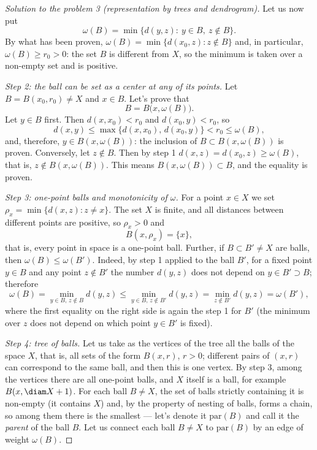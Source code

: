 \documentclass[a4paper,12pt]{report}
\begin{document}
\begin{proof}[Solution to the problem \textup{3} \textup{(}representation by trees and dendrogram\textup{)}]
Let us now put
\[
\omega(B)=\min\bigl\{d(y,z):\ y\in B,\ z\notin B\bigr\} .
\]
By what has been proven, $\omega(B)=\min\{d(x_0,z):z\notin B\}$ and, in particular, $\omega(B)\ge r_0>0$\textup{:} the set $B$ is different from $X$, so the minimum is taken over a non-empty set and is positive.

\textit{Step \textup{2}\textup{:} the ball can be set as a center at any of its points.} Let $B=B(x_0,r_0)\ne X$ and $x\in B$. Let's prove that
\[
B=B\bigl(x,\omega(B)\bigr).
\]
Let $y\in B$ first. Then $d(x,x_0)<r_0$ and $d(x_0,y)<r_0$, so
\[
d(x,y)\le\max\bigl\{d(x,x_0),\,d(x_0,y)\bigr\}<r_0\le\omega(B),
\]
and, therefore, $y\in B(x,\omega(B))$\textup{:} the inclusion of $B\subset B(x,\omega(B))$ is proven. Conversely, let $z\notin B$. Then by step \textup{1} $d(x,z)=d(x_0,z)\ge\omega(B)$, that is, $z\notin B(x,\omega(B))$. This means $B(x,\omega(B))\subset B$, and the equality is proven.

\textit{Step \textup{3}\textup{:} one-point balls and monotonicity of $\omega$.} For a point $x\in X$ we set $\rho_x=\min\{d(x,z):z\ne x\}$. The set $X$ is finite, and all distances between different points are positive, so $\rho_x>0$ and
\[
B(x,\rho_x)=\{x\},
\]
that is, every point in space is a one-point ball. Further, if $B\subset B'\ne X$ are balls, then $\omega(B)\le\omega(B')$. Indeed, by step \textup{1} applied to the ball $B'$, for a fixed point $y\in B$ and any point $z\notin B'$ the number $d(y,z)$ does not depend on $y\in B'\supset B$\textup{;} therefore
\[
\omega(B)=\min_{y\in B,\,z\notin B}d(y,z)\le\min_{y\in B,\,z\notin B'}d(y,z)=\min_{z\notin B'}d(y,z)=\omega(B'),
\]
where the first equality on the right side is again the step \textup{1} for $B'$ \textup{(}the minimum over $z$ does not depend on which point $y\in B'$ is fixed\textup{)}.

\textit{Step \textup{4}\textup{:} tree of balls.} Let us take as the vertices of the tree all the balls of the space $X$, that is, all sets of the form $B(x,r)$, $r>0$\textup{;} different pairs of $(x,r)$ can correspond to the same ball, and then this is one vertex. By step \textup{3}, among the vertices there are all one-point balls, and $X$ itself is a ball, for example $B(x,\diam X+1)$. For each ball $B\ne X$, the set of balls strictly containing it is non-empty \textup{(}it contains $X$\textup{)} and, by the property of nesting of balls, forms a chain, so among them there is the smallest --- let's denote it $\mathrm{par}(B)$ and call it the \emph{parent} of the ball $B$. Let us connect each ball $B\ne X$ to $\mathrm{par}(B)$ by an edge of weight $\omega(B)$.


\end{proof}
\end{document}
